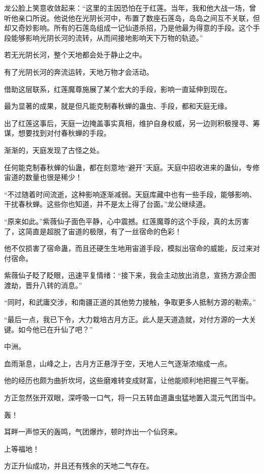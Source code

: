 \begin{this_body}
龙公脸上笑意收敛起来：“这里的主因恐怕在于红莲。当年，我和他大战一场，曾听他亲口所说。他说他在光阴长河中，布置了数座石莲岛，岛岛之间互不关联，但却又奇妙影响。所有的石莲岛组成一记仙道杀招，乃是他最为得意的手段。这个手段能够影响光阴长河的流转，从而间接地影响天下万物的轨迹。”

若无光阴长河，整个天地都会处于静止之中。

有了光阴长河的奔流运转，天地万物才会活动。

借助这层联系，红莲魔尊施展了某个宏大的手段，影响一直延伸到现在。

最为显著的成果，就是但凡能克制春秋蝉的蛊虫、手段，都和天庭无缘。

出了红莲这事后，天庭一边掩盖事实真相，维护自身权威，另一边则积极搜寻、筹谋，想要找到对付春秋蝉的手段。

渐渐的，天庭发现了古怪之处。

任何能克制春秋蝉的仙蛊，都在刻意地“避开”天庭。天庭中招收进来的蛊仙，专修宙道的数量也很是稀少！

“不过随着时间流逝，这种影响逐渐减弱。天庭库藏中也有一些手段，能够影响、干扰春秋蝉。这些你也知道，并不是太上得了台面。”龙公继续道。

“原来如此。”紫薇仙子面色平静，心中震撼。红莲魔尊的这个手段，真的太厉害了，这简直是超脱了宙道的极限，有了一丝宿命的色彩！

他不仅损害了宿命蛊，而且还硬生生地用宙道手段，模拟出宿命的威能，反过来对付宿命。

紫薇仙子眨了眨眼，迅速平复情绪：“接下来，我会主动放出消息，宣扬方源企图渡劫，晋升八转的消息。”

“同时，和武庸交涉，和南疆正道的其他势力接触，争取更多人抵制方源的勒索。”

“最后一点，我已下令，大力栽培古月方正。此人是天道造就，对付方源的一大关键。如今他已在升仙了吧？”

中洲。

血雨渐息，山峰之上，古月方正悬浮于空，天地人三气逐渐浓缩成一点。

他的经历也颇为曲折坎坷，这些磨难转变成财富，让他能顺利地把握三气平衡。

方正忽然张开双眼，深呼吸一口气，将一只五转血道蛊虫猛地置入混元气团当中。

轰！

耳畔一声惊天的轰鸣，气团爆炸，顿时炸出一个仙窍来。

上等福地！

方正升仙成功，并且还有残余的天地二气存在。


\end{this_body}
